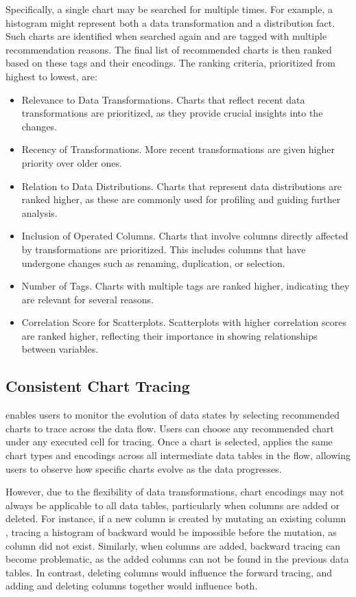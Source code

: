 Specifically, a single chart may be searched for multiple times. 
For example, a histogram might represent both a data transformation and a distribution fact. 
Such charts are identified when searched again and are tagged with multiple recommendation reasons. 
The final list of recommended charts is then ranked based on these tags and their encodings.
The ranking criteria, prioritized from highest to lowest, are:
\begin{itemize}[leftmargin=*]
\item Relevance to Data Transformations. Charts that reflect recent data transformations are prioritized, as they provide crucial insights into the changes.
\item Recency of Transformations. More recent transformations are given higher priority over older ones.
\item Relation to Data Distributions. Charts that represent data distributions are ranked higher, as these are commonly used for profiling and guiding further analysis.
\item Inclusion of Operated Columns. Charts that involve columns directly affected by transformations are prioritized. This includes columns that have undergone changes such as renaming, duplication, or selection.
\item Number of Tags. Charts with multiple tags are ranked higher, indicating they are relevant for several reasons.
\item Correlation Score for Scatterplots. Scatterplots with higher correlation scores are ranked higher, reflecting their importance in showing relationships between variables.
\end{itemize}

\subsection{Consistent Chart Tracing}

\system{} enables users to monitor the evolution of data states by selecting recommended charts to trace across the data flow. 
Users can choose any recommended chart under any executed cell for tracing. 
Once a chart is selected, \system{} applies the same chart types and encodings across all intermediate data tables in the flow, allowing users to observe how specific charts evolve as the data progresses.

However, due to the flexibility of data transformations, chart encodings may not always be applicable to all data tables, particularly when columns are added or deleted. 
For instance, if a new column  is created by mutating an existing column , tracing a histogram of  backward would be impossible before the mutation, as column  did not exist. Similarly, when columns are added, backward tracing can become problematic, as the added columns can not be found in the previous data tables. 
In contrast, deleting columns would influence the forward tracing, and adding and deleting columns together would influence both. 

